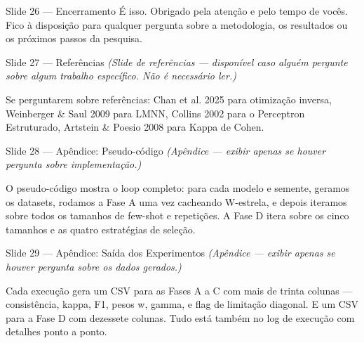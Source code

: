 \documentclass[aspectratio=169, 14pt]{beamer}
\begin{document}
\begin{frame}{Slide 26 — Encerramento}
  É isso. Obrigado pela atenção e pelo tempo de vocês. Fico à disposição para qualquer pergunta sobre a metodologia, os resultados ou os próximos passos da pesquisa.
\end{frame}

\begin{frame}{Slide 27 — Referências}
  \textit{(Slide de referências — disponível caso alguém pergunte sobre algum trabalho específico. Não é necessário ler.)}

  Se perguntarem sobre referências: Chan et al. 2025 para otimização inversa, Weinberger \& Saul 2009 para LMNN, Collins 2002 para o Perceptron Estruturado, Artstein \& Poesio 2008 para Kappa de Cohen.
\end{frame}

\begin{frame}{Slide 28 — Apêndice: Pseudo-código}
  \textit{(Apêndice — exibir apenas se houver pergunta sobre implementação.)}

  O pseudo-código mostra o loop completo: para cada modelo e semente, geramos os datasets, rodamos a Fase A uma vez cacheando W-estrela, e depois iteramos sobre todos os tamanhos de few-shot e repetições. A Fase D itera sobre os cinco tamanhos e as quatro estratégias de seleção.
\end{frame}

\begin{frame}{Slide 29 — Apêndice: Saída dos Experimentos}
  \textit{(Apêndice — exibir apenas se houver pergunta sobre os dados gerados.)}

  Cada execução gera um CSV para as Fases A a C com mais de trinta colunas — consistência, kappa, F1, pesos w, gamma, e flag de limitação diagonal. E um CSV para a Fase D com dezessete colunas. Tudo está também no log de execução com detalhes ponto a ponto.
\end{frame}
\end{document}
